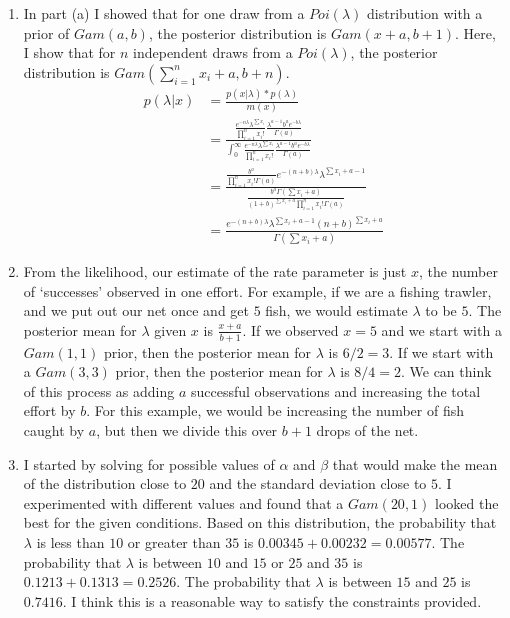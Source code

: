 \documentclass[12pt]{article}\usepackage[]{graphicx}\usepackage[]{color}
\begin{document}
\begin{doublespacing}
\begin{enumerate}
\begin{enumerate}
\item In part (a) I showed that for one draw from a $Poi(\lambda)$ distribution with a prior of $Gam(a,b)$, the posterior distribution is $Gam(x+a, b+1)$. Here, I show that for $n$ independent draws from a $Poi(\lambda)$, the posterior distribution is $Gam(\sum_{i=1}^nx_i+a, b+n)$. 
\begin{align*}
p(\lambda|x) &= \frac{p(x|\lambda)*p(\lambda)}{m(x)} \\
&= \frac{\frac{e^{-n\lambda}\lambda^{\sum x_i}}{\prod_{i=1}^nx_i!}\frac{\lambda^{a-1}b^ae^{-b\lambda}}{\Gamma(a)}}{\int_0^{\infty}\frac{e^{-n\lambda}\lambda^{\sum x_i}}{\prod_{i=1}^nx_i!}\frac{\lambda^{a-1}b^{a}e^{-b\lambda}}{\Gamma(a)}} \\
&= \frac{\frac{b^a}{\prod_{i=1}^nx_i!\Gamma(a)}e^{-(n+b)\lambda}\lambda^{\sum x_i+a-1}}{\frac{b^a\Gamma(\sum x_i+a)}{(1+b)^{\sum x_i+a}\prod_{i=1}^nx_i!\Gamma(a)}} \\
&= \frac{e^{-(n+b)\lambda}\lambda^{\sum x_i+a-1}(n+b)^{\sum x_i+a}}{\Gamma(\sum x_i+a)}
\end{align*}

\item From the likelihood, our estimate of the rate parameter is just $x$, the number of `successes' observed in one effort. For example, if we are a fishing trawler, and we put out our net once and get $5$ fish, we would estimate $\lambda$ to be $5$. The posterior mean for $\lambda$ given $x$ is $\frac{x+a}{b+1}$. If we observed $x=5$ and we start with a $Gam(1,1)$ prior, then the posterior mean for $\lambda$ is $6/2=3$. If we start with a $Gam(3,3)$ prior, then the posterior mean for $\lambda$ is $8/4=2$. We can think of this process as adding $a$ successful observations and increasing the total effort by $b$. For this example, we would be increasing the number of fish caught by $a$, but then we divide this over $b+1$ drops of the net.

\item I started by solving for possible values of $\alpha$ and $\beta$ that would make the mean of the distribution close to $20$ and the standard deviation close to $5$. I experimented with different values and found that a $Gam(20, 1)$ looked the best for the given conditions. Based on this distribution, the probability that $\lambda$ is less than $10$ or greater than $35$ is $0.00345+0.00232=0.00577$. The probability that $\lambda$ is between $10$ and $15$ or $25$ and $35$ is $0.1213+0.1313 = 0.2526$. The probability that $\lambda$ is between $15$ and $25$ is $0.7416$. I think this is a reasonable way to satisfy the constraints provided.


\end{enumerate}
\end{enumerate}
\end{doublespacing}
\end{document}
